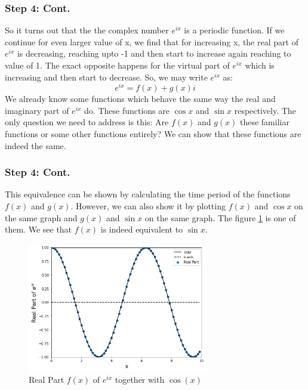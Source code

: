 \documentclass{beamer}
\begin{document}
\begin{frame}
    \frametitle{Step 4: Cont.}
    So it turns out that the the complex number $e^{ix}$ is a periodic function. If we continue for even larger value of x, we find that for increasing x, the real part of $e^{ix}$ is decreasing, reaching upto -1 and then start to increase again reaching to value of 1. The exact opposite happens for the virtual part of $e^{ix}$ which is increasing and then start to decrease.
    So, we may write $e^{ix}$ as: 
    \begin{equation}
        \label{eq:9}
        e^{ix} = f(x) + g(x)i
    \end{equation}
    \pause
    We already know some functions which behave the same way the real and imaginary part of $e^{ix}$ do. These functions are $\cos{x}$ and $\sin{x}$ respectively. The only question we need to address is this: Are $f(x)$ and $g(x)$ these familiar functions or some other functions entirely? We can show that these functions are indeed the same.
\end{frame}

\begin{frame}
    \frametitle{Step 4: Cont.}
    This equivalence can be shown by calculating the time period of the functions $f(x)$ and $g(x)$. However, we can also show it by plotting $f(x)$ and $\cos{x}$ on the same graph and $g(x)$ and $\sin{x}$ on the same graph. The figure \ref{fig:real} is one of them.
    We see that $f(x)$ is indeed equivalent to $\sin{x}$.
    \begin{figure}
        \centering
        \includegraphics[width=0.7\textwidth, height=0.5\textheight]{img/real.png}
        \caption{\label{fig:real}Real Part $f(x)$ of $e^{ix}$ together with $\cos(x)$}
    \end{figure}
\end{frame}
\end{document}
